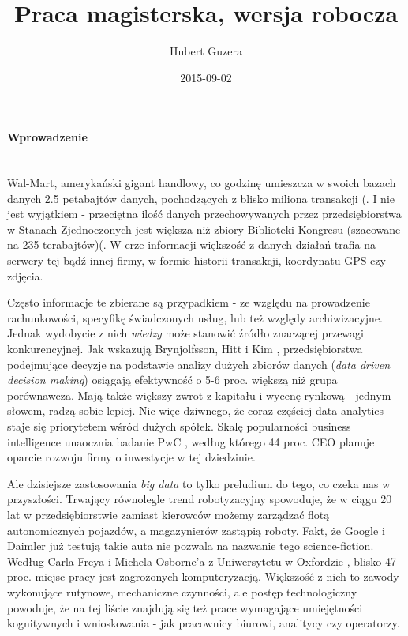 \documentclass{article}
\title{Praca magisterska, wersja robocza}
\date{2015-09-02}
\author{Hubert Guzera}
\begin{document}
\maketitle




\paragraph{Wprowadzenie} \mbox{}\\

Wal-Mart, amerykański gigant handlowy, co godzinę umieszcza w swoich bazach danych 2.5 petabajtów danych, pochodzących z blisko miliona transakcji (\cite{Economist2010}. I nie jest wyjątkiem - przeciętna ilość danych przechowywanych przez przedsiębiorstwa w Stanach Zjednoczonych jest większa niż zbiory Biblioteki Kongresu (szacowane na 235 terabajtów)(\cite{McKinsey2011}. W erze informacji większość z danych działań trafia na serwery tej bądź innej firmy, w formie historii transakcji, koordynatu GPS czy zdjęcia. 

Często informacje te zbierane są przypadkiem - ze względu na prowadzenie rachunkowości, specyfikę świadczonych usług, lub też względy archiwizacyjne. Jednak wydobycie z nich \textit{wiedzy} może stanowić źródło znaczącej przewagi konkurencyjnej.  Jak wskazują Brynjolfsson, Hitt i Kim \cite{Brynjolfsson2011}, przedsiębiorstwa podejmujące decyzje na podstawie analizy dużych zbiorów danych (\textit{data driven decision making}) osiągają efektywność o 5-6 proc. większą niż grupa porównawcza. Mają także większy zwrot z kapitału i wycenę rynkową - jednym słowem, radzą sobie lepiej. Nic więc dziwnego, że coraz częściej data analytics staje się priorytetem wśród dużych spółek. Skalę popularności business intelligence unaocznia badanie PwC \cite{PwC2014}, według którego 44 proc. CEO planuje oparcie rozwoju firmy o inwestycje w tej dziedzinie. 

Ale dzisiejsze zastosowania \textit{big data} to tylko preludium do tego, co czeka nas w przyszłości. Trwający równolegle trend robotyzacyjny spowoduje, że w ciągu 20 lat w przedsiębiorstwie zamiast kierowców możemy zarządzać flotą autonomicznych pojazdów, a magazynierów zastąpią roboty. Fakt, że Google i Daimler już testują takie auta nie pozwala na nazwanie tego science-fiction. Według Carla Freya i Michela Osborne'a z Uniwersytetu w Oxfordzie \cite{Frey2013}, blisko 47 proc. miejsc pracy jest zagrożonych komputeryzacją. Większość z nich to zawody wykonujące rutynowe, mechaniczne czynności, ale postęp technologiczny powoduje, że na tej liście znajdują się też prace wymagające umiejętności kognitywnych i wnioskowania - jak pracownicy biurowi, analitycy czy operatorzy. 
\end{document}
